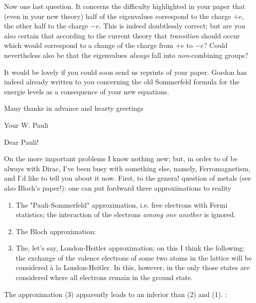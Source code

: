 \documentclass{article}
\newcommand{\nc}[2]{
  \newcommand{#1}{#2}
}
\begin{document}
Now one last question. It concerns the difficulty highlighted in your paper that (even in your new theory) half of the eigenvalues correspond to the charge $+e$, the other half to the charge $-e$. This is indeed doubtlessly correct; but are you also certain that according to the current theory that \textit{transition} should occur which would correspond to a change of the charge from $+e$ to $-e$? Could nevertheless also be that the eigenvalues \textit{always} fall into \textit{non}-combining groups?

It would be lovely if you could soon send us reprints of your paper. Gordon has indeed already written to you concerning the old Sommerfeld formula for the energie levels as a consequence of your new equations.

Many thanks in advance and hearty greetings

Your W. Pauli

\date{May 3, 1928}

\nc{\f}{f}

Dear Pauli!

On the more important problems I know nothing new; but, in order to of be always  with Dirac, I've been busy with something else, namely, Ferromagnetism, and I'd like to tell you about it now. First, to the genera! question of metals (see also Bloch's paper!): one can put fordward three approximations to reality{}

\begin{enumerate}
    \item The "Pauli-Sommerfeld" approximation, i.e. free electrons with Fermi statistics; the interaction of the electrons \textit{among one another} is ignored.
    \item The Bloch approximation: 
    \item The, let's say, London-Heitler approximation; on this I think the following: the exchange of the valence electrons of some two atoms in the lattice will be considered \`a la London-Heitler. In this, however, in the  only those states are considered where all electrons remain in the ground state.
\end{enumerate}

The approximation (3) apparently leads to an inferior  than (2) and (1). :
\end{document}
